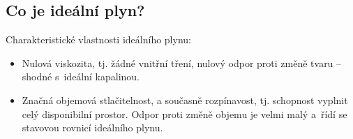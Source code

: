 
\subsection{Co je ideální plyn?}
Charakteristické vlastnosti ideálního plynu:
\begin{itemize}
	\item Nulová viskozita, tj. žádné vnitřní tření, nulový odpor proti změně tvaru -- shodné s~ideální kapalinou.
	\item Značná objemová stlačitelnost, a současně rozpínavost, tj. schopnost vyplnit celý disponibilní prostor. Odpor proti změně objemu je velmi malý a~řídí se stavovou rovnicí ideálního plynu.
\end{itemize}

